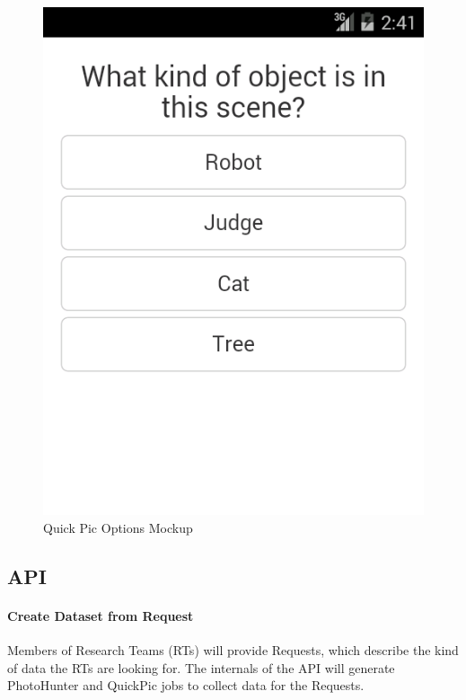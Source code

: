 \documentclass{article}
\begin{document}
\begin{figure}[H]
\caption{Quick Pic Options Mockup}
\centering
\includegraphics[width =\textwidth, height=\textheight, keepaspectratio]{ss_quickpic_options}
\end{figure}

\subsection{API}

\paragraph{Create Dataset from Request}

Members of Research Teams (RTs) will provide Requests, which describe
the kind of data the RTs are looking for.  The internals of the API will
generate PhotoHunter and QuickPic jobs to collect data for the
Requests.
\end{document}

